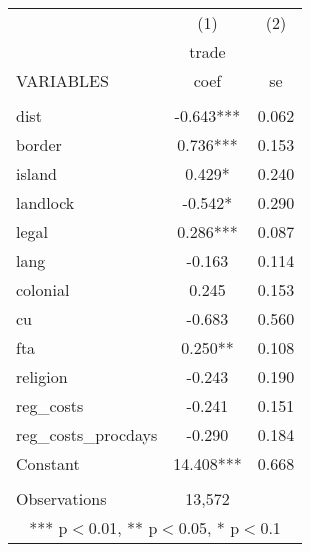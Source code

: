 \documentclass[]{article}
\begin{document}
\begin{tabular}{lcc} \hline
 & (1) & (2) \\
 & trade &  \\
VARIABLES & coef & se \\ \hline
 &  &  \\
dist & -0.643*** & 0.062 \\
border & 0.736*** & 0.153 \\
island & 0.429* & 0.240 \\
landlock & -0.542* & 0.290 \\
legal & 0.286*** & 0.087 \\
lang & -0.163 & 0.114 \\
colonial & 0.245 & 0.153 \\
cu & -0.683 & 0.560 \\
fta & 0.250** & 0.108 \\
religion & -0.243 & 0.190 \\
reg\_costs & -0.241 & 0.151 \\
reg\_costs\_procdays & -0.290 & 0.184 \\
Constant & 14.408*** & 0.668 \\
 &  &  \\
 Observations & 13,572 &  \\ \hline
\multicolumn{3}{c}{ *** p$<$0.01, ** p$<$0.05, * p$<$0.1} \\
\end{tabular}
\end{document}
